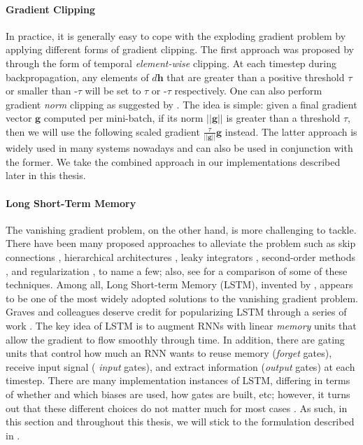 \paragraph{Gradient Clipping} In practice, it is generally easy to cope with the exploding gradient problem by
applying different forms of gradient clipping. The first approach was proposed by
 through the form of temporal {\it element-wise} clipping. At
each timestep during backpropagation, any elements of $d\bm{h}$ that are greater
than a positive threshold $\tau$ or smaller than -$\tau$ will be set
to $\tau$ or -$\tau$ respectively. One can also perform gradient {\it norm}
clipping as suggested by . The idea is simple: given a final
gradient vector $\bm{g}$ computed per mini-batch, if its norm
$||\bm{g}||$ is greater than a threshold
$\tau$, then we will use the following scaled gradient $\frac{\tau}{||\bm{g}||} \bm{g}$
instead. The latter approach is widely used in many systems nowadays and
can also be used in conjunction with the former. We take the combined approach
in our implementations described later in this thesis. 

\paragraph{Long Short-Term Memory}
The vanishing gradient problem, on the other hand, is more challenging to
tackle. There have been many proposed approaches to alleviate the problem such
as skip connections \cite{waibel90,lin96}, hierarchical
architectures \cite{el96}, leaky integrators \cite{Jaeger2007}, second-order
methods \cite{MartensS11}, and
regularization \cite{pascanu13}, to name a few; also, see \cite{bengio13} for a
comparison of some of these techniques. Among all, Long Short-term
Memory (LSTM), invented by  , appears to be one of the most
widely adopted solutions to the vanishing gradient problem.
Graves and colleagues deserve credit for popularizing LSTM through a series of
work \cite{graves05,graves09,graves13c}. 
The key idea of LSTM
is to augment RNNs with linear {\it memory} units that allow the gradient to
flow smoothly through time. In addition, there are gating units that control how
much an RNN wants to reuse memory ({\it forget} gates), receive input signal ({\it
input} gates), and extract information ({\it output} gates) at each timestep.
There are many implementation instances of LSTM, differing in terms of
whether and which biases are used, how gates are built, etc; however, it turns
out that these different choices do not matter much for most cases
\cite{jozefowicz15,greff15}. As such, in this section and throughout this
thesis, we will stick to the formulation described in \cite{zaremba14}.


